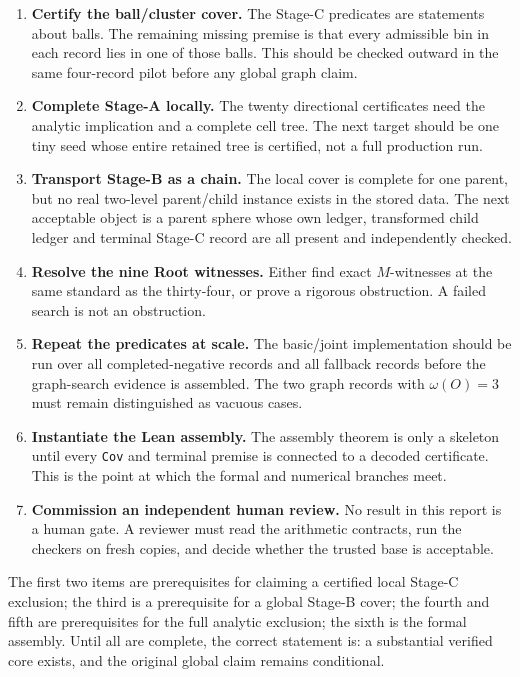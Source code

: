 \documentclass[10pt]{article}
\theoremstyle{definition}
\begin{document}
\begin{enumerate}[label=\textbf{N\arabic*.}]
\item \textbf{Certify the ball/cluster cover.} The Stage-C predicates are statements about balls. The remaining missing premise is that every admissible bin in each record lies in one of those balls. This should be checked outward in the same four-record pilot before any global graph claim.
\item \textbf{Complete Stage-A locally.} The twenty directional certificates need the analytic implication and a complete cell tree. The next target should be one tiny seed whose entire retained tree is certified, not a full production run.
\item \textbf{Transport Stage-B as a chain.} The local cover is complete for one parent, but no real two-level parent/child instance exists in the stored data. The next acceptable object is a parent sphere whose own ledger, transformed child ledger and terminal Stage-C record are all present and independently checked.
\item \textbf{Resolve the nine Root witnesses.} Either find exact $M$-witnesses at the same standard as the thirty-four, or prove a rigorous obstruction. A failed search is not an obstruction.
\item \textbf{Repeat the predicates at scale.} The basic/joint implementation should be run over all completed-negative records and all fallback records before the graph-search evidence is assembled. The two graph records with $\omega(O)=3$ must remain distinguished as vacuous cases.
\item \textbf{Instantiate the Lean assembly.} The assembly theorem is only a skeleton until every \texttt{Cov} and terminal premise is connected to a decoded certificate. This is the point at which the formal and numerical branches meet.
\item \textbf{Commission an independent human review.} No result in this report is a human gate. A reviewer must read the arithmetic contracts, run the checkers on fresh copies, and decide whether the trusted base is acceptable.
\end{enumerate}

The first two items are prerequisites for claiming a certified local Stage-C exclusion; the third is a prerequisite for a global Stage-B cover; the fourth and fifth are prerequisites for the full analytic exclusion; the sixth is the formal assembly. Until all are complete, the correct statement is: a substantial verified core exists, and the original global claim remains conditional.
\end{document}
